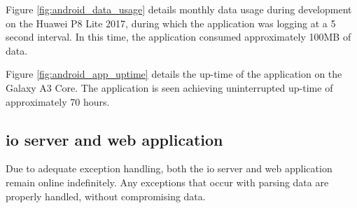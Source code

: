Figure \ref{fig:android_data_usage} details monthly data usage during development on the Huawei P8 Lite 2017, during which the application was logging at a 5 second interval.
In this time, the application consumed approximately 100MB of data.

Figure \ref{fig:android_app_uptime} details the up-time of the application on the Galaxy A3 Core.
The application is seen achieving uninterrupted up-time of approximately 70 hours.

\subsection{\Ac{io} server and web application}
Due to adequate exception handling, both the \ac{io} server and web application remain online indefinitely.
Any exceptions that occur with parsing data are properly handled, without compromising data.

\pagebreak

